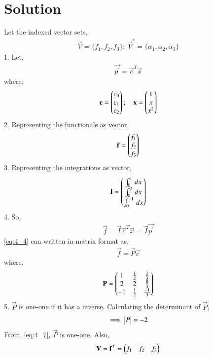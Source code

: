 \documentclass[journal,12pt,twocolumn]{IEEEtran}
\begin{document}
\section{Solution}
Let the indexed vector sets,
\begin{align}
    \vec{V} = \{f_1, f_2, f_3\}; \: \vec{V}^* = \{\alpha_1, \alpha_2, \alpha_3\} \nonumber 
\end{align}
1. Let,
\begin{align}
    \vec{p^\prime} = \vec{c}^T\vec{x} \label{eq:4_1}
\end{align}
where,
\begin{align}
    \mathbf{c} = \begin{pmatrix}c_0 \\ c_1 \\ c_2\end{pmatrix}; \quad 
    \mathbf{x} = \begin{pmatrix}1 \\ x \\ x^2\end{pmatrix} \nonumber
\end{align}
2. Representing the functionals as vector,
\begin{align}
    \mathbf{f} = \begin{pmatrix}f_1 \\ f_2 \\ f_3\end{pmatrix} \label{eq:4_2}
\end{align}
3. Representing the integrations as vector,
\begin{align}
    \mathbf{I} = \begin{pmatrix}\int_{0}^{1} \, dx \\ \int_{0}^{2} \, dx \\
    \int_{0}^{-1} \, dx\end{pmatrix} \label{eq:4_3}
\end{align}
4. So,
\begin{align}
    \vec{f} = \vec{I} \vec{c}^T \vec{x} = \vec{I} \vec{p^\prime} \label{eq:4_4}
\end{align}
\eqref{eq:4_4} can written in matrix format as,
\begin{align}
    \vec{f} = \vec{P} \vec{c} \label{eq:4_5}
\end{align}
where,
\begin{align}
    \mathbf{P}  = \begin{pmatrix}1 & \frac{1}{2} & \frac{1}{3} \\ 2 & 2 & \frac{8}{3} \\ -1 & \frac{1}{2} & \frac{-1}{3}\end{pmatrix} \label{eq:4_6}
\end{align}
5. $\vec{P}$ is one-one if it has a inverse. Calculating the determinant of $\vec{P}$,
\begin{align}
    \implies \begin{vmatrix}P\end{vmatrix} = -2 \label{eq:4_7}
\end{align}
From, \eqref{eq:4_7}, $\vec{P}$ is one-one. Also,
\begin{align}
    \mathbf{V} = \mathbf{f}^T = \begin{pmatrix}f_1 & f_2 & f_3\end{pmatrix} \label{eq:4_8} 
\end{align}
\end{document}
